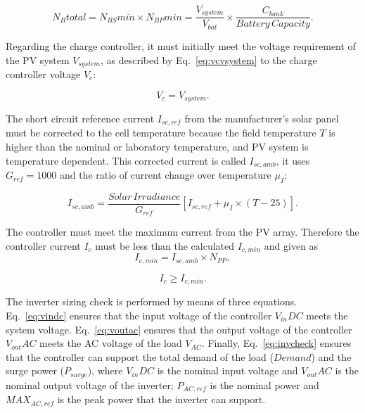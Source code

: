 \documentclass[runningheads]{llncs}
\begin{document}
\begin{equation}
\label{eq:Nbtotal}
N_{B}total = N_{BS}min \times N_{BP}min = \frac{V_{system}}{V_{bat}} \times \frac{C_{bank}}{Battery \, Capacity}.
\end{equation}

Regarding the charge controller, it must initially meet the voltage requirement of the PV system $V_{system}$, as described by Eq.~\ref{eq:vcvsystem} to the charge controller voltage $V_{c}$: 

\begin{equation}
\label{eq:vcvsystem}
V_{c} = V_{system}.
\end{equation}

The short circuit reference current $ I_{sc,ref} $ from the manufacturer's solar panel must be corrected to the cell temperature because the field temperature $ T $ is higher than the nominal or laboratory temperature, and PV system is temperature dependent. This corrected current is called $I_{sc,amb}$, it uses $G_{ref} = 1000$ and the ratio of current change over temperature $\mu_{I}$:

\begin{equation}
\label{eq:iscamb}
I_{sc,amb} = \frac{Solar \, Irradiance}{G_{ref}} \left[I_{sc,ref} + \mu_{I} \times (T-25) \right]. 
\end{equation}

The controller must meet the maximum current from the PV array. Therefore the controller current $I_{c}$ must be less than the calculated $I_{c,min}$ and given as
%
\begin{equation}
\label{eq:icmin}
I_{c,min} = I_{sc,amb} \times N_{PP},
\end{equation}

\begin{equation}
\label{eq:icicmin}
I_{c} \geq I_{c,min}.
\end{equation}

The inverter sizing check is performed by means of three equations. Eq.~\ref{eq:vindc} ensures that the input voltage of the controller $V_{in}DC$ meets the system voltage. Eq.~\ref{eq:voutac} ensures that the output voltage of the controller $V_{out}AC$ meets the AC voltage of the load $V_{AC}$. Finally, Eq.~\ref{eq:invcheck} ensures that the controller can support the total demand of the load ($Demand$) and the surge power ($P_{surge}$), where $V_{in}DC$ is the nominal input voltage and $V_{out}AC$ is the nominal output voltage of the inverter; $P_{AC,ref}$ is the nominal power and $MAX_{AC,ref}$ is the peak power that the inverter can support.
\end{document}
